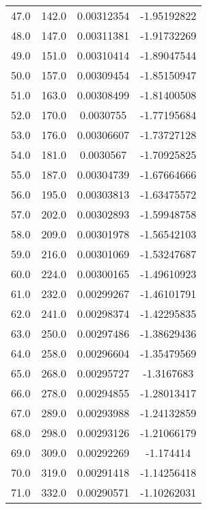\documentclass[
  captions=tableheading,
]{scrartcl}
\begin{document}
\begin{table}
\begin{tabular}{c c c c}
47.0    &    142.0   &    0.00312354    &    -1.95192822\\
48.0    &    147.0   &    0.00311381    &    -1.91732269\\
49.0    &    151.0   &    0.00310414    &    -1.89047544\\
50.0    &    157.0   &    0.00309454    &    -1.85150947\\
51.0    &    163.0   &    0.00308499    &    -1.81400508\\
52.0    &    170.0   &    0.0030755     &    -1.77195684\\
53.0    &    176.0   &    0.00306607    &    -1.73727128\\
54.0    &    181.0   &    0.0030567     &    -1.70925825\\
55.0    &    187.0   &    0.00304739    &    -1.67664666\\
56.0    &    195.0   &    0.00303813    &    -1.63475572\\
57.0    &    202.0   &    0.00302893    &    -1.59948758\\
58.0    &    209.0   &    0.00301978    &    -1.56542103\\
59.0    &    216.0   &    0.00301069    &    -1.53247687\\
60.0    &    224.0   &    0.00300165    &    -1.49610923\\
61.0    &    232.0   &    0.00299267    &    -1.46101791\\
62.0    &    241.0   &    0.00298374    &    -1.42295835\\
63.0    &    250.0   &    0.00297486    &    -1.38629436\\
64.0    &    258.0   &    0.00296604    &    -1.35479569\\
65.0    &    268.0   &    0.00295727    &    -1.3167683\\
66.0    &    278.0   &    0.00294855    &    -1.28013417\\
67.0    &    289.0   &    0.00293988    &    -1.24132859\\
68.0    &    298.0   &    0.00293126    &    -1.21066179\\
69.0    &    309.0   &    0.00292269    &    -1.174414\\
70.0    &    319.0   &    0.00291418    &    -1.14256418\\
71.0    &    332.0   &    0.00290571    &    -1.10262031\\

\end{tabular}
\end{table}
\end{document}
